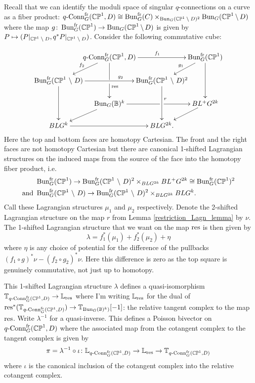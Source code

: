 \documentclass[10pt, oneside]{article}
\newcommand{\qconn}{q\text{-Conn}}
\newcommand{\fr}{\mathrm{fr}}
\begin{document}
\begin{construction}
Recall that we can identify the moduli space of singular $q$-connections on a curve as a fiber product: $\qconn_G^{\fr}(\bb{CP}^1, D) \iso \bun_G^\fr(C) \times_{\bun_G(\bb{CP}^1 \! \bs \! D)^2} \bun_G(\bb{CP}^1 \! \bs \! D)$ where the map $g \colon \bun_G^\fr(\bb{CP}^1) \to \bun_G(\bb{CP}^1 \! \bs \! D)$ is given by $P \mapsto (P|_{\mathbb{CP}^1 \! \ \backslash \  \! D}, q^*P|_{\mathbb{CP}^1 \! \ \backslash \  \! D})$.  Consider the following commutative cube:

\[\xymatrix@C-30pt@R-8pt{
& \qconn_G^{\fr}(\bb{CP}^1, D) \ar[rr]^{f_1} \ar'[d][dd]^(.25){\mr{res}} & & \bun_G^{\fr}(\bb{CP}^1) \ar[dd]
\\
\bun_G^{\fr}(\bb{CP}^1 \bs D) \ar@{<-}[ur]^{f_2} \ar[rr]^(.6){g_2} \ar[dd] & & \bun_G^{\fr}(\bb{CP}^1 \bs D)^2 \ar@{<-}[ur]^{g_1} \ar[dd]^(.4)r
\\
& \bun_G(\bb B)^k \ar'[r][rr] & & BL^+G^{2k}
\\
BLG^k \ar[rr]\ar@{<-}[ur] & & BLG^{2k}. \ar@{<-}[ur]
}\]
Here the top and bottom faces are homotopy Cartesian.  The front and the right faces are not homotopy Cartesian but there are canonical 1-shifted Lagrangian structures on the induced maps from the source of the face into the homotopy fiber product, i.e.
\begin{align*}
&\bun_G^{\fr}(\bb{CP}^1) \to \bun_G^{\fr}(\bb{CP}^1 \bs D)^2 \times_{BLG^{2k}} BL^+G^{2k} \iso \bun_G^{\fr}(\bb{CP}^1)^2 \\
\text{and } &\bun_G^{\fr}(\bb{CP}^1 \bs D) \to \bun_G^{\fr}(\bb{CP}^1 \bs D)^2 \times_{BLG^{2k}} BLG^{k}.
\end{align*}
Call these Lagrangian structures $\mu_1$ and $\mu_2$ respectively.  Denote the 2-shifted Lagrangian structure on the map $r$ from Lemma \ref{restriction_Lagn_lemma} by $\nu$.  The 1-shifted Lagrangian structure that we want on the map $\mathrm{res}$ is then given by 
\[\lambda = f_1^*(\mu_1) + f_2^*(\mu_2) + \eta
\]
where $\eta$ is any choice  of potential for the difference of the pullbacks $(f_1 \circ g)^*\nu - (f_2 \circ g_2)^*\nu$.  Here this difference is zero as the top square is genuinely commutative, not just up to homotopy.

This 1-shifted Lagrangian structure $\lambda$ defines a quasi-isomorphism $\bb T_{\qconn_G^{\fr}(\bb{CP}^1, D)} \to \bb L_{\mr{res}}$ where I'm writing $\mathbb{L}_{\mathrm{res}}$ for the dual of $\mr{res}^*(\bb T_{\qconn_G^{\fr}(\bb{CP}^1, D)}) \to \bb T_{\bun_G(\bb B)^k)}[-1]$: the relative tangent complex to the map $\mathrm{res}$.  Write $\lambda^{-1}$ for a quasi-inverse.  This defines a Poisson bivector on $\qconn_G^{\fr}(\bb{CP}^1, D)$ where the associated map from the cotangent complex to the tangent complex is given by
\[\pi = \lambda^{-1} \circ \iota \colon \bb L_{\qconn_G^{\fr}(\bb{CP}^1, D)} \to \bb L_{\mr{res}} \to \bb T_{\qconn_G^{\fr}(\bb{CP}^1, D)}\]
where $\iota$ is the canonical inclusion of the cotangent complex into the relative cotangent complex.


\end{construction}
\end{document}
